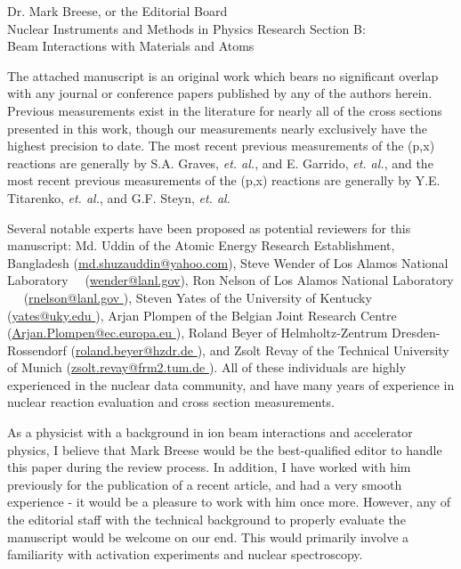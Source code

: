 \documentclass{letter} %
\begin{document}
\begin{letter}{Dr. Mark Breese, or the Editorial Board \\
Nuclear Instruments and Methods in Physics Research Section B: \\
Beam Interactions with Materials and Atoms}
 
\noindent The attached manuscript is an original work which bears no significant overlap with any journal or conference papers published by any of the authors herein. Previous measurements exist in the literature for nearly all of the cross sections presented in this work, though our measurements nearly exclusively have the highest precision to date.
The most recent previous measurements of the (p,x) reactions are generally by  S.A. Graves, \emph{et. al.}\footnotemark[7], and E. Garrido, \emph{et. al.}\footnotemark[8], and the most recent previous measurements of the (p,x) reactions are generally by Y.E. Titarenko, \emph{et. al.}\footnotemark[9], and G.F. Steyn, \emph{et. al.}\footnotemark[10]

Several notable experts have been proposed as potential reviewers for this manuscript: Md. Uddin of the Atomic Energy Research Establishment, Bangladesh (\url{md.shuzauddin@yahoo.com}), Steve Wender of Los Alamos National Laboratory  (\url{wender@lanl.gov}), Ron Nelson of Los Alamos National Laboratory  	   (\url{rnelson@lanl.gov	}), Steven Yates of the University of Kentucky	  (\url{yates@uky.edu	}), Arjan Plompen of the Belgian Joint Research Centre	   (\url{Arjan.Plompen@ec.europa.eu	}), Roland Beyer of Helmholtz-Zentrum Dresden-Rossendorf	  (\url{roland.beyer@hzdr.de	}), and Zsolt Revay of the Technical University of Munich	  (\url{zsolt.revay@frm2.tum.de	}).  All of these individuals are highly experienced in the nuclear data community, and have many years of experience in nuclear reaction evaluation and cross section measurements.

As a physicist with a background in ion beam interactions and accelerator physics, I believe that Mark Breese would be the best-qualified editor to handle this paper during the review process. In addition, I have worked with him previously for the publication of a recent article\footnotemark[11], and had a very smooth experience - it would be a pleasure to work with him once more. However, any of the editorial staff with the technical background to properly evaluate the manuscript would be welcome on our end.  This would primarily involve a familiarity with activation experiments and nuclear spectroscopy. 




\end{letter}
\end{document}
